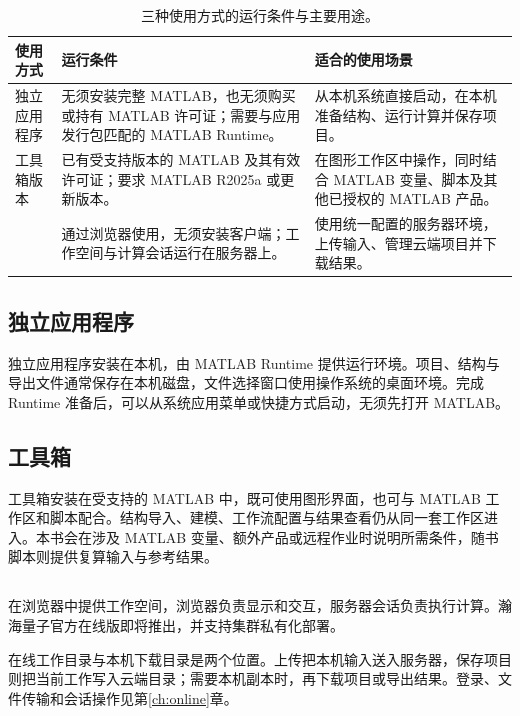 \begin{table}[!htb]
\centering
\caption{三种使用方式的运行条件与主要用途。}
\label{tab:usage-modes}
\begin{tabularx}{\linewidth}{>{\RaggedRight\arraybackslash}p{28mm}>{\RaggedRight\arraybackslash}X>{\RaggedRight\arraybackslash}X}
\toprule
使用方式 & 运行条件 & 适合的使用场景 \\
\midrule
独立应用程序 & 无须安装完整 MATLAB\regmark{}，也无须购买或持有 MATLAB\regmark{} 许可证；需要与应用发行包匹配的 MATLAB\regmark{} Runtime。 & 从本机系统直接启动，在本机准备结构、运行计算并保存项目。 \\
工具箱版本 & 已有受支持版本的 MATLAB\regmark{} 及其有效许可证；要求 MATLAB\regmark{} R2025a 或更新版本。 & 在图形工作区中操作，同时结合 MATLAB\regmark{} 变量、脚本及其他已授权的 MATLAB\regmark{} 产品。 \\
\ksonline{} & 通过浏览器使用，无须安装客户端；工作空间与计算会话运行在服务器上。 & 使用统一配置的服务器环境，上传输入、管理云端项目并下载结果。 \\
\bottomrule
\end{tabularx}
\end{table}

\subsection{独立应用程序}
独立应用程序安装在本机，由 MATLAB\regmark{} Runtime 提供运行环境。项目、结构与导出文件通常保存在本机磁盘，文件选择窗口使用操作系统的桌面环境。完成 Runtime 准备后，可以从系统应用菜单或快捷方式启动，无须先打开 MATLAB\regmark{}。

\subsection{\regmark{} 工具箱}
工具箱安装在受支持的 MATLAB\regmark{} 中，既可使用图形界面，也可与 MATLAB\regmark{} 工作区和脚本配合。结构导入、建模、工作流配置与结果查看仍从同一套工作区进入。本书会在涉及 MATLAB\regmark{} 变量、额外产品或远程作业时说明所需条件，随书脚本则提供复算输入与参考结果。

\subsection{\headinglatin{\ksonline}}
\ksonline{} 在浏览器中提供工作空间，浏览器负责显示和交互，服务器会话负责执行计算。瀚海量子\regmark{}官方在线版即将推出，并支持集群私有化部署。

在线工作目录与本机下载目录是两个位置。上传把本机输入送入服务器，保存项目则把当前工作写入云端目录；需要本机副本时，再下载项目或导出结果。登录、文件传输和会话操作见第\ref{ch:online}章。

